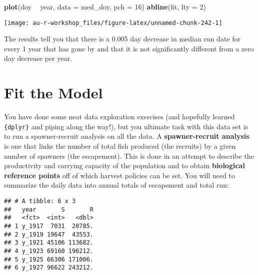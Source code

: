 \documentclass[]{book}
\newenvironment{Shaded}{\begin{snugshade}}{\end{snugshade}}
\newcommand{\KeywordTok}[1]{\textcolor[rgb]{0.13,0.29,0.53}{\textbf{#1}}}
\newcommand{\DataTypeTok}[1]{\textcolor[rgb]{0.13,0.29,0.53}{#1}}
\newcommand{\DecValTok}[1]{\textcolor[rgb]{0.00,0.00,0.81}{#1}}
\newcommand{\StringTok}[1]{\textcolor[rgb]{0.31,0.60,0.02}{#1}}
\newcommand{\OperatorTok}[1]{\textcolor[rgb]{0.81,0.36,0.00}{\textbf{#1}}}
\newcommand{\NormalTok}[1]{#1}
\theoremstyle{definition}
\theoremstyle{definition}
\theoremstyle{definition}
\theoremstyle{remark}
\begin{document}
\begin{Shaded}
\begin{Highlighting}[]
\KeywordTok{plot}\NormalTok{(doy }\OperatorTok{~}\StringTok{ }\NormalTok{year, }\DataTypeTok{data =}\NormalTok{ med_doy, }\DataTypeTok{pch =} \DecValTok{16}\NormalTok{)}
\KeywordTok{abline}\NormalTok{(fit, }\DataTypeTok{lty =} \DecValTok{2}\NormalTok{)}
\end{Highlighting}
\end{Shaded}

\begin{center}\texttt{[image: au-r-workshop\_files/figure-latex/unnamed-chunk-242-1]} \end{center}

The results tell you that there is a 0.005 day decrease in median run
date for every 1 year that has gone by and that it is not significantly
different from a zero day decrease per year.

\section{Fit the Model}\label{fit-the-model}

You have done some neat data exploration exercises (and hopefully
learned \texttt{\{dplyr\}} and piping along the way!), but you ultimate
task with this data set is to run a spawner-recruit analysis on all the
data. A \textbf{spawner-recruit analysis} is one that links the number
of total fish produced (the recruits) by a given number of spawners (the
escapement). This is done in an attempt to describe the productivity and
carrying capacity of the population and to obtain \textbf{biological
reference points} off of which harvest policies can be set. You will
need to summarize the daily data into annual totals of escapement and
total run:

\begin{Shaded}
\end{Shaded}

\begin{verbatim}
## # A tibble: 6 x 3
##   year       S       R
##   <fct>  <int>   <dbl>
## 1 y_1917  7031  20785.
## 2 y_1919 19647  43553.
## 3 y_1921 45106 113682.
## 4 y_1923 69160 196212.
## 5 y_1925 66306 171006.
## 6 y_1927 96622 243212.
\end{verbatim}
\end{document}
